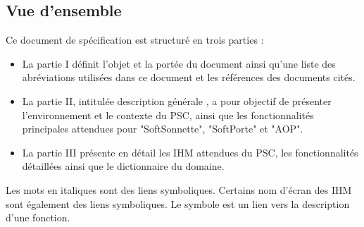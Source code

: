\subsection{Vue d'ensemble}
Ce document de spécification est structuré en trois parties :
\begin{itemize}
      \item La partie I définit l’objet et la portée du document ainsi qu’une liste des abréviations utilisées dans ce document et les références des documents cités.
      \item La partie II, intitulée \og description générale \fg{}, a pour objectif de présenter l'environnement et le contexte du PSC, ainsi que les fonctionnalités principales attendues pour "SoftSonnette", "SoftPorte" et "AOP".
      \item La partie III présente en détail les IHM attendues du PSC, les fonctionnalités détaillées ainsi que le dictionnaire du domaine.
\end{itemize}

Les mots en italiques sont des liens symboliques.
Certains nom d'écran des IHM sont également des liens symboliques.
Le symbole \og * \fg est un lien vers la description d'une fonction.